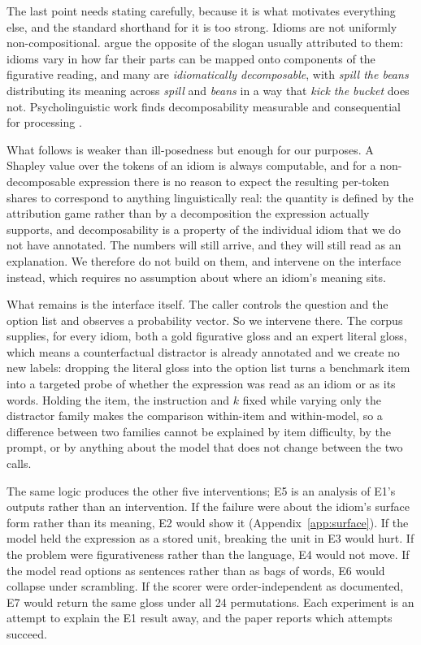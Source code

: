 \documentclass[11pt]{article}
\begin{document}
The last point needs stating carefully, because it is what motivates everything
else, and the standard shorthand for it is too strong. Idioms are not uniformly
non-compositional. \citet{nunberg1994idioms} argue the opposite of the slogan
usually attributed to them: idioms vary in how far their parts can be mapped onto
components of the figurative reading, and many are \emph{idiomatically
decomposable}, with \emph{spill the beans} distributing its meaning across
\emph{spill} and \emph{beans} in a way that \emph{kick the bucket} does not.
Psycholinguistic work finds decomposability measurable and consequential for
processing \citep{gibbs1989kick,titone1999compositional}.

What follows is weaker than ill-posedness but enough for our purposes. A Shapley
value over the tokens of an idiom is always computable, and for a
non-decomposable expression there is no reason to expect the resulting per-token
shares to correspond to anything linguistically real: the quantity is defined by
the attribution game rather than by a decomposition the expression actually
supports, and decomposability is a property of the individual idiom that we do not
have annotated. The numbers will still arrive, and they will still read as an
explanation. We therefore do not build on them, and intervene on the interface
instead, which requires no assumption about where an idiom's meaning sits.

What remains is the interface itself. The caller controls the question and the
option list and observes a probability vector. So we intervene there. The
corpus supplies, for every idiom, both a gold figurative gloss and an expert
literal gloss, which means a counterfactual distractor is already annotated and
we create no new labels: dropping the literal gloss into the option list turns a
benchmark item into a targeted probe of whether the expression was read as an
idiom or as its words. Holding the item, the instruction and $k$ fixed while
varying only the distractor family makes the comparison within-item and
within-model, so a difference between two families cannot be explained by item
difficulty, by the prompt, or by anything about the model that does not change
between the two calls.

The same logic produces the other five interventions; E5 is an analysis of E1's
outputs rather than an intervention. If the failure were about
the idiom's surface form rather than its meaning, E2 would show it
(Appendix~\ref{app:surface}). If the model
held the expression as a stored unit, breaking the unit in E3 would hurt. If the
problem were figurativeness rather than the language, E4 would not move. If the
model read options as sentences rather than as bags of words, E6 would collapse
under scrambling. If the scorer were order-independent as documented, E7 would
return the same gloss under all 24 permutations. Each experiment is an attempt
to explain the E1 result away, and the paper reports which attempts succeed.
\end{document}
